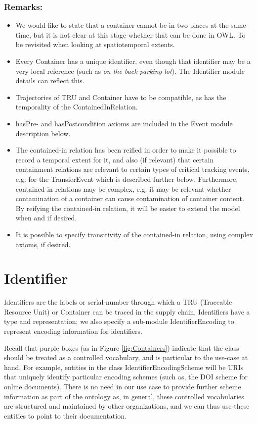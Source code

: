\subsubsection*{Remarks:}
\begin{itemize}
    \item We would like to state that a container cannot be in two places at the same time, but it is not clear at this stage whether that can be done in OWL. To be revisited when looking at spatiotemporal extents.
    \item Every Container has a unique identifier, even though that identifier may be a very local reference (such as \emph{on the back parking lot}). The Identifier module details can reflect this.
    \item Trajectories of TRU and Container have to be compatible, as has the temporality of the ContainedInRelation.
    \item hasPre- and hasPostcondition axioms are included in the Event module description below.
    \item The contained-in relation has been reified in order to make it possible to record a temporal extent for it, and also (if relevant) that certain containment relations are relevant to certain types of critical tracking events, e.g. for the TransferEvent which is described further below. Furthermore, contained-in relations may be complex, e.g. it may be relevant whether contamination of a container can cause contamination of container content. By reifying the contained-in relation, it will be easier to extend the model when and if desired.
    \item It is possible to specify transitivity of the contained-in relation, using complex axioms, if desired.
\end{itemize}

\section{Identifier}
\label{ssec:identifier}
Identifiers are the labels or serial-number through which a TRU (Traceable Resource Unit) or Container can be traced in the supply chain. Identifiers have a type and representation; we also specify a sub-module \textsf{IdentifierEncoding} to represent encoding information for identifiers. 

Recall that purple boxes (as in Figure \ref{fig:Containers}) indicate that the class should be treated as a controlled vocabulary, and is particular to the use-case at hand. For example, entities in the class \textsf{IdentifierEncodingScheme} will be URIs that uniquely identify particular encoding schemes (such as, the DOI scheme for online documents). There is no need in our use case to provide further scheme information as part of the ontology as, in general, these controlled vocabularies are structured and maintained by other organizations, and we can thus use these entities to point to their documentation.


